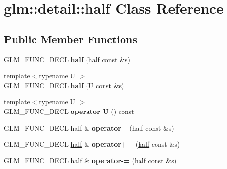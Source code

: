 \hypertarget{classglm_1_1detail_1_1half}{\section{glm\-:\-:detail\-:\-:half Class Reference}
\label{classglm_1_1detail_1_1half}
}
\subsection*{Public Member Functions}
\begin{DoxyCompactItemize}
\item 
\hypertarget{classglm_1_1detail_1_1half_a14fb2431e4900ad9da30306186975477}{G\-L\-M\-\_\-\-F\-U\-N\-C\-\_\-\-D\-E\-C\-L {\bfseries half} (\hyperlink{classglm_1_1detail_1_1half}{half} const \&s)}\label{classglm_1_1detail_1_1half_a14fb2431e4900ad9da30306186975477}

\item 
\hypertarget{classglm_1_1detail_1_1half_a058baffdfe67cf3cc1979789c6f07979}{{\footnotesize template$<$typename U $>$ }\\G\-L\-M\-\_\-\-F\-U\-N\-C\-\_\-\-D\-E\-C\-L {\bfseries half} (U const \&s)}\label{classglm_1_1detail_1_1half_a058baffdfe67cf3cc1979789c6f07979}

\item 
\hypertarget{classglm_1_1detail_1_1half_aff05b952429059ac38c31ad0a02d79f1}{{\footnotesize template$<$typename U $>$ }\\G\-L\-M\-\_\-\-F\-U\-N\-C\-\_\-\-D\-E\-C\-L {\bfseries operator U} () const }\label{classglm_1_1detail_1_1half_aff05b952429059ac38c31ad0a02d79f1}

\item 
\hypertarget{classglm_1_1detail_1_1half_a184ae21ab747a04d51ba40e757751261}{G\-L\-M\-\_\-\-F\-U\-N\-C\-\_\-\-D\-E\-C\-L \hyperlink{classglm_1_1detail_1_1half}{half} \& {\bfseries operator=} (\hyperlink{classglm_1_1detail_1_1half}{half} const \&s)}\label{classglm_1_1detail_1_1half_a184ae21ab747a04d51ba40e757751261}

\item 
\hypertarget{classglm_1_1detail_1_1half_aa4bf63310d4f1ee92671ac8dc34bb190}{G\-L\-M\-\_\-\-F\-U\-N\-C\-\_\-\-D\-E\-C\-L \hyperlink{classglm_1_1detail_1_1half}{half} \& {\bfseries operator+=} (\hyperlink{classglm_1_1detail_1_1half}{half} const \&s)}\label{classglm_1_1detail_1_1half_aa4bf63310d4f1ee92671ac8dc34bb190}

\item 
\hypertarget{classglm_1_1detail_1_1half_ace54fe7145e4dbda35e4fdeda15c6113}{G\-L\-M\-\_\-\-F\-U\-N\-C\-\_\-\-D\-E\-C\-L \hyperlink{classglm_1_1detail_1_1half}{half} \& {\bfseries operator-\/=} (\hyperlink{classglm_1_1detail_1_1half}{half} const \&s)}\label{classglm_1_1detail_1_1half_ace54fe7145e4dbda35e4fdeda15c6113}


\end{DoxyCompactItemize}

